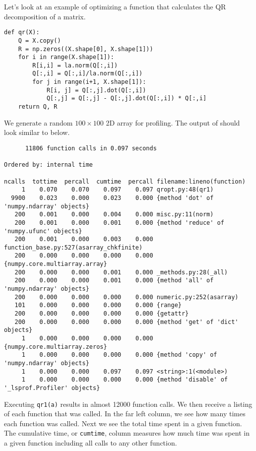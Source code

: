 Let's look at an example of optimizing a function that calculates the QR decomposition of a matrix.
\begin{lstlisting}
def qr(X):
    Q = X.copy()
    R = np.zeros((X.shape[0], X.shape[1]))
    for i in range(X.shape[1]):
        R[i,i] = la.norm(Q[:,i])
        Q[:,i] = Q[:,i]/la.norm(Q[:,i])
        for j in range(i+1, X.shape[1]):
            R[i, j] = Q[:,j].dot(Q[:,i])
            Q[:,j] = Q[:,j] - Q[:,j].dot(Q[:,i]) * Q[:,i]
    return Q, R
\end{lstlisting}
We generate a random $100 \times 100$ 2D array for profiling.  The output of  should look similar to below.
{\scriptsize
\begin{verbatim}
      11806 function calls in 0.097 seconds

Ordered by: internal time

ncalls  tottime  percall  cumtime  percall filename:lineno(function)
     1    0.070    0.070    0.097    0.097 qropt.py:48(qr1)
  9900    0.023    0.000    0.023    0.000 {method 'dot' of 'numpy.ndarray' objects}
   200    0.001    0.000    0.004    0.000 misc.py:11(norm)
   200    0.001    0.000    0.001    0.000 {method 'reduce' of 'numpy.ufunc' objects}
   200    0.001    0.000    0.003    0.000 function_base.py:527(asarray_chkfinite)
   200    0.000    0.000    0.000    0.000 {numpy.core.multiarray.array}
   200    0.000    0.000    0.001    0.000 _methods.py:28(_all)
   200    0.000    0.000    0.001    0.000 {method 'all' of 'numpy.ndarray' objects}
   200    0.000    0.000    0.000    0.000 numeric.py:252(asarray)
   101    0.000    0.000    0.000    0.000 {range}
   200    0.000    0.000    0.000    0.000 {getattr}
   200    0.000    0.000    0.000    0.000 {method 'get' of 'dict' objects}
     1    0.000    0.000    0.000    0.000 {numpy.core.multiarray.zeros}
     1    0.000    0.000    0.000    0.000 {method 'copy' of 'numpy.ndarray' objects}
     1    0.000    0.000    0.097    0.097 <string>:1(<module>)
     1    0.000    0.000    0.000    0.000 {method 'disable' of '_lsprof.Profiler' objects}
\end{verbatim}
}
Executing \texttt{qr1(a)} results in almost 12000 function calls.  
We then receive a listing of each function that was called.  In the far left column, we see how many times each function was called.
Next we see the total time spent in a given function.
The cumulative time, or \texttt{cumtime}, column measures how much time was spent in a given function including all calls to any other function.

